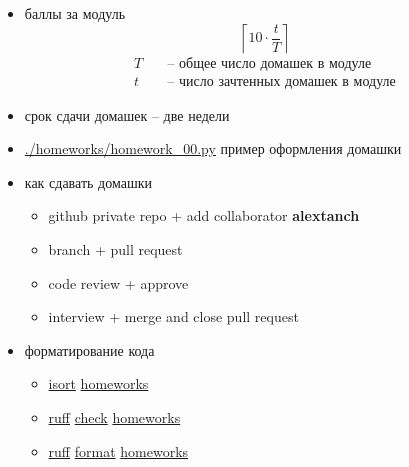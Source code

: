 \documentclass[
    12pt, 
    usepdftitle=false,
    aspectratio=1610
]{beamer}
\begin{document}
\begin{frame}
\begin{itemize}
    \item баллы за модуль
    $$
        \left\lceil10\cdot\frac{t}{T}\right\rceil
    $$
    \begin{align*}
        T\quad  &\mbox{-- общее число домашек в модуле} \\
        t\quad  &\mbox{-- число зачтенных домашек в модуле}
    \end{align*}
    \item срок сдачи домашек -- две недели
    \item \url{./homeworks/homework_00.py} пример оформления домашки
    \item как сдавать домашки
    \begin{itemize}
        \item[] github private repo + add collaborator \textbf{alextanch}
        \item[] branch + pull request
        \item[] code review + approve
        \item[] interview + merge and close pull request
    \end{itemize}
    \item форматирование кода
    \begin{itemize}
        \item[] \url{isort} \url{homeworks}
	    \item[] \url{ruff} \url{check} \url{homeworks}
	    \item[] \url{ruff} \url{format} \url{homeworks}
    \end{itemize}
    
\end{itemize}
\end{frame}
\end{document}
